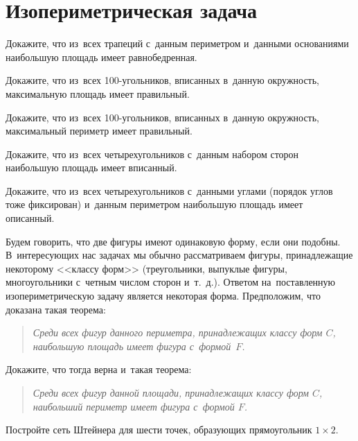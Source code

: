 

\section*{Изопериметрическая задача}


\begin{problems}

\item
Докажите, что из~всех трапеций с~данным периметром и~данными основаниями
наибольшую площадь имеет равнобедренная.

\item
Докажите, что из~всех 100-угольников, вписанных в~данную окружность,
максимальную площадь имеет правильный.

\item
Докажите, что из~всех 100-угольников, вписанных в~данную окружность,
максимальный периметр имеет правильный.

\item
Докажите, что из~всех четырехугольников с~данным набором сторон наибольшую
площадь имеет вписанный.

\item
Докажите, что из~всех четырехугольников с~данными углами (порядок углов тоже
фиксирован) и~данным периметром наибольшую площадь имеет описанный.

\item
Будем говорить, что две фигуры имеют одинаковую форму, если они подобны.
В~интересующих нас задачах мы обычно рассматриваем фигуры, принадлежащие
некоторому <<классу форм>>
(треугольники, выпуклые фигуры, многоугольники с~четным числом сторон и~т.~д.).
Ответом на~поставленную изопериметрическую задачу является некоторая форма.
Предположим, что доказана такая теорема:
\begin{quote}\em
Среди всех фигур данного периметра, принадлежащих классу форм $C$, наибольшую
площадь имеет фигура с~формой~$F$.
\end{quote}
Докажите, что тогда верна и~такая теорема:
\begin{quote}\em
Среди всех фигур данной площади, принадлежащих классу форм $C$, наибольший
периметр имеет фигура с~формой $F$.
\end{quote}

\item
Постройте сеть Штейнера для шести точек, образующих прямоугольник $1 \times 2$.


\end{problems}
